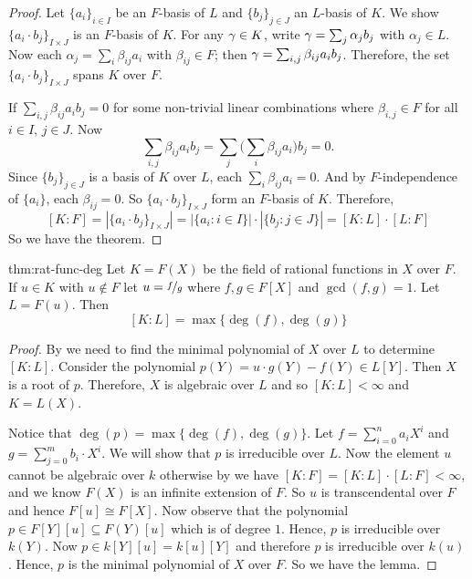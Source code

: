 \begin{proof}
  Let $\{a_i\}_{i\in I}$ be an $F$-basis of $L$ and $\{b_j\}_{j\in J}$ an $L$-basis of $K$. 
  We show $\{a_i\cdot b_j\}_{I\times J}$ is an $F$-basis of $K$. 
  For any $\gamma\in K$, write $\gamma=\sum_j\alpha_jb_j$ with $\alpha_j\in L$. 
  Now each $\alpha_j=\sum_i\beta_{ij}a_i$ with $\beta_{ij}\in F$; then $\gamma=\sum_{i,j}\beta_{ij}a_ib_j$. 
  Therefore, the set $\{a_i\cdot b_j\}_{I\times J}$ spans $K$ over $F$. 
  
  If $\sum_{i,j}\beta_{ij}a_ib_j=0$ for some non-trivial linear combinations where $\beta_{i,j}\in F$ for all $i\in I$, $j\in J$. 
  Now $$\sum_{i,j}\beta_{ij}a_ib_j=\sum_j\bigl(\sum_i\beta_{ij}a_i\bigr)b_j=0.$$ 
  Since $\{b_j\}_{j\in J}$ is a basis of $K$ over $L$, each $\sum_i\beta_{ij}a_i=0$. 
  And by $F$-independence of $\{a_i\}$, each $\beta_{ij}=0$. 
  So $\{a_i\cdot b_j\}_{I\times J}$ form an $F$-basis of $K$. 
  Therefore, $$[K:F]=|\{a_i\cdot b_j\}_{I\times J}|=|\{a_i\colon i\in I\}|\cdot |\{b_j\colon j\in J\}|=[K\colon L]\cdot [L\colon F]$$ 
  So we have the theorem. 
\end{proof}

\begin{lemma}{}{thm:rat-func-deg}
  Let $K=F(X)$ be the field of rational functions in $X$ over $F$. 
  If $u\in K$ with $u\notin F$ let $u=\nicefrac{f}{g}$ where $f,g\in F[X]$ and $\gcd(f,g)=1$. 
  Let $L=F(u)$. 
  Then $$[K\colon L]=\max\{\deg(f),\deg(g)\}$$
\end{lemma}
\begin{proof}
  By \SimpleExtthm we need to find the minimal polynomial of $X$ over $L$ to determine $[K\colon L]$. 
  Consider the polynomial $p(Y)=u\cdot g(Y)-f(Y)\in L[Y]$. 
  Then $X$ is a root of $p$. 
  Therefore, $X$ is algebraic over $L$ and so $[K\colon L]<\infty$ and $K=L(X)$. 

  Notice that $\deg(p)=\max\{\deg(f),\deg(g)\}$. 
  Let $f=\sum_{i=0}^n a_iX^i$ and $g=\sum_{j=0}^m b_i\cdot X^i$. 
  We will show that $p$ is irreducible over $L$. 
  Now the element $u$ cannot be algebraic over $k$ otherwise by \TowerLawthm we have $[K\colon F]=[K\colon L]\cdot [L\colon F]<\infty$, and we know $F(X)$ is an infinite extension of $F$. 
  So $u$ is transcendental over $F$ and hence $F[u]\cong F[X]$. 
  Now observe that the polynomial $p\in F[Y][u]\subseteq F(Y)[u]$ which is of degree $1$. 
  Hence, $p$ is irreducible over $k(Y)$. 
  Now $p\in k[Y][u]=k[u][Y]$ and therefore $p$ is irreducible over $k(u)$. 
  Hence, $p$ is the minimal polynomial of $X$ over $F$. 
  So we have the lemma.
\end{proof}

